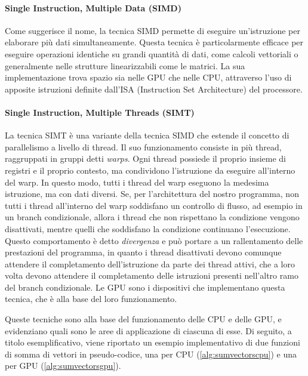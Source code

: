 \paragraph{Single Instruction, Multiple Data (SIMD)}
\label{para:simd}

Come suggerisce il nome, la tecnica SIMD permette di eseguire un'istruzione per elaborare
più dati simultaneamente. Questa tecnica è particolarmente efficace per eseguire
operazioni identiche su grandi quantità di dati, come calcoli vettoriali o generalmente
nelle strutture linearizzabili come le matrici. La sua implementazione trova
spazio sia nelle GPU che nelle CPU, attraverso l'uso di apposite istruzioni definite
dall'ISA (Instruction Set Architecture) del processore.

\paragraph{Single Instruction, Multiple Threads (SIMT)\cite{generalpurposegpu}}
\label{para:simt}

La tecnica SIMT è una variante della tecnica SIMD che estende il concetto di parallelismo
a livello di thread. Il suo funzionamento consiste in più thread, raggruppati in
gruppi detti \textit{warps}. Ogni thread possiede il proprio insieme di registri
e il proprio contesto, ma condividono l'istruzione da eseguire all'interno del
warp. In questo modo, tutti i thread del warp eseguono la medesima istruzione, ma
con dati diversi. Se, per l'architettura del nostro programma, non tutti i
thread all'interno del warp soddisfano un controllo di flusso, ad esempio in un branch
condizionale, allora i thread che non rispettano la condizione vengono
disattivati, mentre quelli che soddisfano la condizione continuano l'esecuzione.
Questo comportamento è detto \textit{divergenza} e può portare a un rallentamento
delle prestazioni del programma, in quanto i thread disattivati devono comunque
attendere il completamento dell'istruzione da parte dei thread attivi, che a loro
volta devono attendere il completamento delle istruzioni presenti nell'altro ramo
del branch condizionale. Le GPU sono i dispositivi che implementano questa
tecnica, che è alla base del loro funzionamento.

\vspace{1em}

Queste tecniche sono alla base del funzionamento delle CPU e delle GPU, e evidenziano
quali sono le aree di applicazione di ciascuna di esse. Di seguito, a titolo esemplificativo,
viene riportato un esempio implementativo di due funzioni di somma di vettori in
pseudo-codice, una per CPU (\ref{alg:sumvectorscpu}) e una per GPU (\ref{alg:sumvectorsgpu}).

